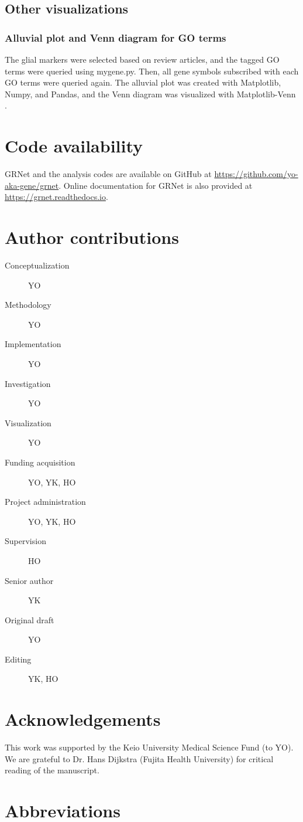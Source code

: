 \documentclass{article}
\begin{document}
\subsection*{Other visualizations}
\subsubsection*{Alluvial plot and Venn diagram for GO terms}
The glial markers were selected based on review articles, and the tagged GO terms were queried using mygene.py. 
Then, all gene symbols subscribed with each GO terms were queried again. The alluvial plot was created with 
Matplotlib, Numpy, and Pandas, and the Venn diagram was visualized with Matplotlib-Venn \cite{matplotlib-venn}.

\section*{Code availability}
GRNet and the analysis codes are available on GitHub at \url{https://github.com/yo-aka-gene/grnet}. Online documentation 
for GRNet is also provided at \url{https://grnet.readthedocs.io}.


\section*{Author contributions}
\begin{description}
  \item[Conceptualization] YO
  \item[Methodology] YO
  \item[Implementation] YO
  \item[Investigation] YO
  \item[Visualization] YO
  \item[Funding acquisition] YO, YK, HO
  \item[Project administration] YO, YK, HO
  \item[Supervision] HO
  \item[Senior author] YK
  \item[Original draft] YO
  \item[Editing] YK, HO
\end{description}

\section*{Acknowledgements}
This work was supported by the Keio University Medical Science Fund (to YO). We are grateful to Dr. Hans 
Dijkstra (Fujita Health University) for critical reading of the manuscript.


\section*{Abbreviations}
\printacronyms[heading=Abbreviations]



\end{document}
